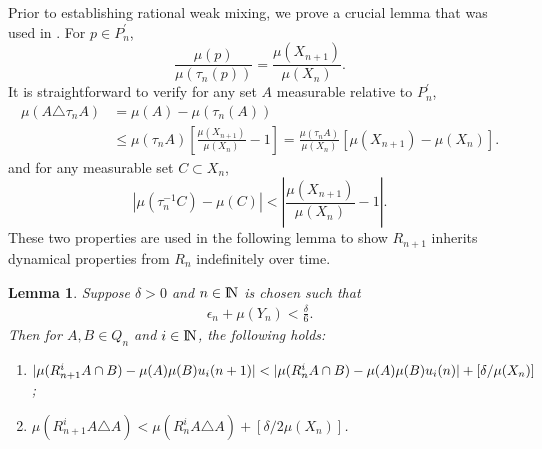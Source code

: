 \documentclass[12pt]{amsart}
\newtheorem{lemma}[theorem]{Lemma}
\begin{document}
Prior to establishing rational weak mixing, we prove 
a crucial lemma that was used in \cite{Towerplex1}. 
For $p\in P_n^{\prime}$,
$$
\frac{\mu (p)}{\mu (\tau_n (p))}=\frac{\mu (X_{n+1})}{\mu (X_n)}.
$$
It is straightforward to verify for any set $A$ measurable relative to $P_n^{\prime}$, 
\begin{align*}
\mu (A\triangle \tau_nA) &= \mu (A) - \mu (\tau_n(A)) \\ 
&\leq \mu (\tau_n A) [ \frac{\mu (X_{n+1})}{\mu (X_n)} - 1 ] 
= \frac{\mu (\tau_n A)}{\mu (X_n)} [ \mu (X_{n+1}) - \mu (X_n) ] . 
\end{align*}
and for any measurable set $C\subset X_n$, 
$$
| \mu (\tau_n^{-1}C) - \mu(C) | <  |\frac{\mu (X_{n+1})}{\mu (X_n)} - 1|.
$$
These two properties are used in the following lemma to show $R_{n+1}$ inherits dynamical 
properties from $R_n$ indefinitely over time. 
\begin{lemma}
\label{rescalinglem}
Suppose $\delta >0$ and $n\in {\hbox{\rm\setbox1=\hbox{I}\copy1\kern-.45\wd1 N}}$ is chosen such that 
\begin{eqnarray*}
\epsilon_n + \mu (Y_n) < \frac{\delta}{6}.
\end{eqnarray*}
Then for $A,B\in Q_n$ and $i\in {\hbox{\rm\setbox1=\hbox{I}\copy1\kern-.45\wd1 N}}$, the following holds:
\begin{enumerate}
\item $|\mu (R_{n+1}^iA\cap B)-\mu (A)\mu (B) u_i(n+1)| \\ 
< |\mu (R_{n}^iA\cap B)-\mu (A)\mu (B) u_i(n)| + [ {\delta} / {\mu (X_n)} ]$; 
\item $\mu (R_{n+1}^iA\triangle A) < \mu (R_{n}^iA\triangle A) + [ {\delta} / {2\mu (X_n)} ]$. 
\end{enumerate}
\end{lemma}
\end{document}
